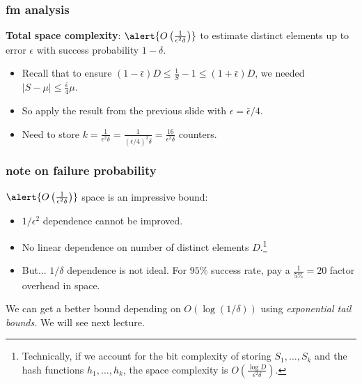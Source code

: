 \documentclass[handout,compress]{beamer}
\begin{document}
\begin{frame}[t]
	\frametitle{fm analysis}
	\textbf{Total space complexity}: $\alert{O\left(\frac{1}{\epsilon^2\delta}\right)}$ to estimate distinct elements up to error $\epsilon$ with success probability $1-\delta$.
	
	\begin{itemize}
		\item Recall that to ensure $(1-\bar{\epsilon}) D \leq \frac{1}{S} - 1 \leq (1+\bar{\epsilon}) D$, we needed  $|S - \mu| \leq \frac{\bar{\epsilon}}{4} \mu$. 
		\item So apply the result from the previous slide with $\epsilon = \bar{\epsilon}/4$. 
		\item Need to store $k = \frac{1}{\epsilon^2\delta} = \frac{1}{(\bar{\epsilon}/4)^2\delta} = \frac{16}{\epsilon^2\delta}$ counters.
	\end{itemize}
\end{frame}

\begin{frame}
	\frametitle{note on failure probability}
	$\alert{O\left(\frac{1}{\epsilon^2\delta}\right)}$ space is an impressive bound:
	\begin{itemize}
		\item $1/\epsilon^2$ dependence cannot be improved.
		\item No linear dependence on number of distinct elements $D$.\footnote{Technically, if we account for the bit complexity of storing $S_1, \ldots, S_k$ and the hash functions $h_1, \ldots, h_k$, the space complexity is $O\left(\frac{\log D}{\epsilon^2\delta}\right)$.}
		\item But... $1/\delta$ dependence is not ideal. For $95\%$ success rate, pay a $\frac{1}{5\%} = 20$ factor overhead in space. 
	\end{itemize}
We can get a better bound depending on $O(\log(1/\delta))$ using \emph{exponential tail bounds.} We will see next lecture.
\end{frame}
\end{document}
